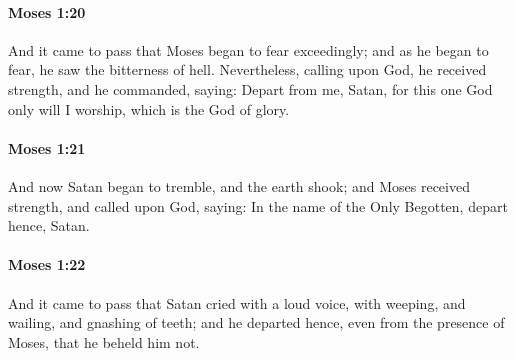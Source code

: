 		\paragraph{Moses 1:20} %
			\label{MOSES-1-20}

			And it came to pass that Moses began to fear exceedingly; and as he began to fear, he saw the bitterness of hell. Nevertheless, calling upon God, he received strength, and he commanded, saying: Depart from me, Satan, for this one God only will I worship, which is the God of glory.


		\paragraph{Moses 1:21} %
			\label{MOSES-1-21}

			And now Satan began to tremble, and the earth shook; and Moses received strength, and called upon God, saying: In the name of the Only Begotten, depart hence, Satan.


		\paragraph{Moses 1:22} %
			\label{MOSES-1-22}

			And it came to pass that Satan cried with a loud voice, with weeping, and wailing, and gnashing of teeth; and he departed hence, even from the presence of Moses, that he beheld him not.


